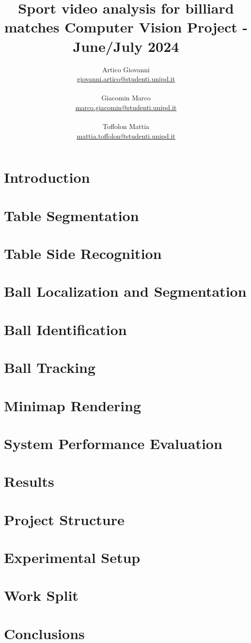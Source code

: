 \documentclass{article}
\title{\huge \textbf{Sport video analysis for billiard matches} \newline \Large Computer Vision Project - June/July 2024
}
\author{Artico Giovanni \\ \href{mailto:giovanni.artico@studenti.unipd.it}{giovanni.artico@studenti.unipd.it} \\ \\
        Giacomin Marco \\  \href{mailto:marco.giacomin@studenti.unipd.it}{marco.giacomin@studenti.unipd.it} \\ \\
        Toffolon Mattia \\ \href{mailto:mattia.toffolon@studenti.unipd.it}{mattia.toffolon@studenti.unipd.it}}
\date{}
\begin{document}
\maketitle
\vspace{10mm}
\tableofcontents

\newpage

\section{Introduction}


\section{Table Segmentation}


\section{Table Side Recognition}


\section{Ball Localization and Segmentation}


\section{Ball Identification}


\section{Ball Tracking}


\section{Minimap Rendering}


\section{System Performance Evaluation}
\label{sec:performance}


\section{Results}
% 

\section{Project Structure}


\section{Experimental Setup}


\section{Work Split}


\section{Conclusions}

\end{document}
